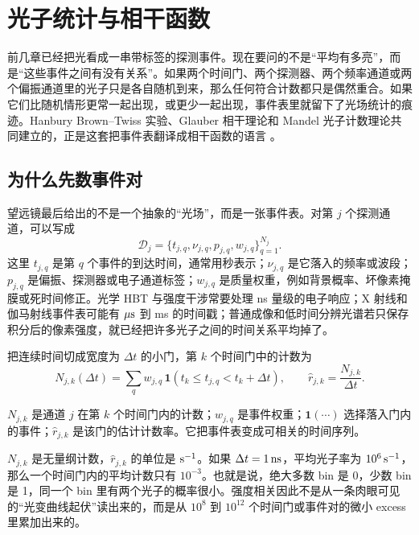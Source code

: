 \chapter{光子统计与相干函数}
\label{chap:04}

\begin{chapteropening}
前几章已经把光看成一串带标签的探测事件。现在要问的不是“平均有多亮”，而是“这些事件之间有没有关系”。如果两个时间门、两个探测器、两个频率通道或两个偏振通道里的光子只是各自随机到来，那么任何符合计数都只是偶然重合。如果它们比随机情形更常一起出现，或更少一起出现，事件表里就留下了光场统计的痕迹。Hanbury Brown--Twiss 实验、Glauber 相干理论和 Mandel 光子计数理论共同建立的，正是这套把事件表翻译成相干函数的语言 \citep{1956Natur.177...27B,1957RSPSA.242..300B,1958RSPSA.248..222B,1961AmJPh..29..539F,1963PhRv..130.2529G,1963PhRv..131.2766G,1965RvMP...37..231M,1995ocqo.book.....M,2000stop.book.....G,2007itcp.book.....W}。
\end{chapteropening}

\section{为什么先数事件对}

望远镜最后给出的不是一个抽象的“光场”，而是一张事件表。对第 \(j\) 个探测通道，可以写成
\[
  \mathcal{D}_j=\{t_{j,q},\nu_{j,q},p_{j,q},w_{j,q}\}_{q=1}^{N_j}.
\]
这里 \(t_{j,q}\) 是第 \(q\) 个事件的到达时间，通常用秒表示；\(\nu_{j,q}\) 是它落入的频率或波段；\(p_{j,q}\) 是偏振、探测器或电子通道标签；\(w_{j,q}\) 是质量权重，例如背景概率、坏像素掩膜或死时间修正。光学 HBT 与强度干涉常要处理 ns 量级的电子响应；X 射线和伽马射线事件表可能有 \(\mu{\rm s}\) 到 ms 的时间戳；普通成像和低时间分辨光谱若只保存积分后的像素强度，就已经把许多光子之间的时间关系平均掉了。

把连续时间切成宽度为 \(\Delta t\) 的小门，第 \(k\) 个时间门中的计数为
\begin{equation}
  N_{j,k}(\Delta t)=\sum_q w_{j,q}\,
  \mathbf{1}\!\left(t_k\leq t_{j,q}<t_k+\Delta t\right),
  \qquad
  \widehat r_{j,k}=\frac{N_{j,k}}{\Delta t}.
  \label{eq:ch04-count-bin}
\end{equation}
\begin{formulaexplain}
\(N_{j,k}\) 是通道 \(j\) 在第 \(k\) 个时间门内的计数；\(w_{j,q}\) 是事件权重；\(\mathbf 1(\cdots)\) 选择落入门内的事件；\(\widehat r_{j,k}\) 是该门的估计计数率。它把事件表变成可相关的时间序列。
\end{formulaexplain}
\(N_{j,k}\) 是无量纲计数，\(\widehat r_{j,k}\) 的单位是 \({\rm s^{-1}}\)。如果 \(\Delta t=1\,{\rm ns}\)，平均光子率为 \(10^6\,{\rm s^{-1}}\)，那么一个时间门内的平均计数只有 \(10^{-3}\)。也就是说，绝大多数 bin 是 0，少数 bin 是 1，同一个 bin 里有两个光子的概率很小。强度相关因此不是从一条肉眼可见的“光变曲线起伏”读出来的，而是从 \(10^8\) 到 \(10^{12}\) 个时间门或事件对的微小 excess 里累加出来的。

